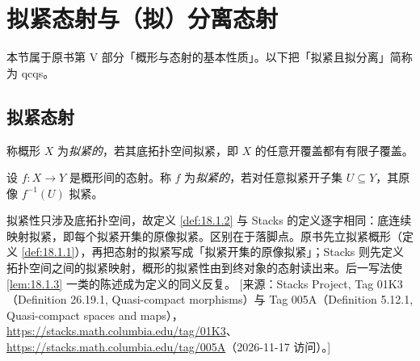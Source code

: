 
\makeatletter
{}
\makeatother

\section{拟紧态射与（拟）分离态射}\label{sec:18}

本节属于原书第 V 部分「概形与态射的基本性质」。以下把「拟紧且拟分离」简称为 qcqs。

\subsection{拟紧态射}\label{sec:18.1}

\begin{definition}\label{def:18.1.1}
称概形 $X$ 为\emph{拟紧的}，若其底拓扑空间拟紧，即 $X$ 的任意开覆盖都有有限子覆盖。
\end{definition}

\begin{definition}\label{def:18.1.2}
设 $f:X\to Y$ 是概形间的态射。称 $f$ 为\emph{拟紧的}，若对任意拟紧开子集 $U\subseteq Y$，其原像 $f^{-1}(U)$ 拟紧。
\end{definition}

\begin{yizhu}
拟紧性只涉及底拓扑空间，故定义 \ref{def:18.1.2} 与 Stacks 的定义逐字相同：底连续映射拟紧，即每个拟紧开集的原像拟紧。区别在于落脚点。原书先立拟紧概形（定义 \ref{def:18.1.1}），再把态射的拟紧写成「拟紧开集的原像拟紧」；Stacks 则先定义拓扑空间之间的拟紧映射，概形的拟紧性由到终对象的态射读出来。后一写法使 \ref{lem:18.1.3} 一类的陈述成为定义的同义反复。
[来源：Stacks Project, Tag 01K3（Definition 26.19.1, Quasi-compact morphisms）与 Tag 005A（Definition 5.12.1, Quasi-compact spaces and maps），\url{https://stacks.math.columbia.edu/tag/01K3}、\url{https://stacks.math.columbia.edu/tag/005A}（2026-11-17 访问）。]
\end{yizhu}

